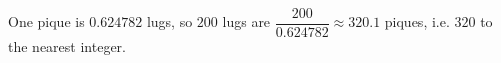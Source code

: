 One pique is $0.624782$ lugs, so $200$ lugs are $\dfrac{200}{0.624782}\approx320.1$ piques, i.e. $\boxed{320}$ to the nearest integer.
